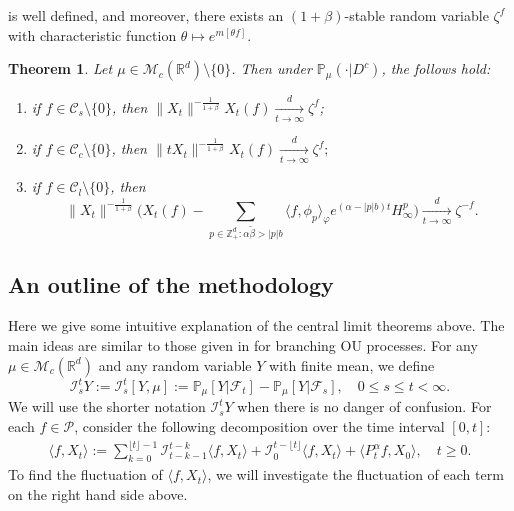 \documentclass[12pt,a4paper]{amsart}
\theoremstyle{plain}
\newtheorem{thm}{Theorem}[section]
\theoremstyle{definition}
\numberwithin{equation}{section}
\begin{document}
    is well defined, and moreover, there exists an $(1+\beta)$-stable random variable $\zeta^f$ with characteristic function $\theta \mapsto e^{m[\theta f]}$.
    \begin{thm}
      \label{thm:M}
    Let $\mu\in \mathcal M_c(\mathbb R^d)\setminus \{0\}$.
    Then under $\mathbb{P}_{\mu}(\cdot|D^c)$, the follows hold:
\begin{enumerate}
\item
  \label{thm:M:1}
  if $f\in \mathcal C_s\setminus\{0\}$, then $\|X_t\|^{- \frac{1}{1+\beta}} X_t(f)  \xrightarrow[t\to \infty]{d} \zeta^f$;
\item
  \label{thm:M:2}
  if $f\in \mathcal C_c\setminus\{0\}$, then
  \(
    \|t X_t\|^{-\frac{1}{1+\beta}} X_t(f)
    \xrightarrow[t\to \infty]{d}
    \zeta^f;
    \)
  \item
    \label{thm:M:3}
    if $f\in \mathcal C_l\setminus\{0\}$, then
\[
  \|X_t\|^{-\frac{1}{1+\beta}} \Big( X_t(f) - \sum_{p\in \mathbb Z^d_+:\alpha \tilde \beta>|p|b}\langle f,\phi_p\rangle_\varphi e^{(\alpha-|p|b)t}H^p_{\infty}\Big)
    \xrightarrow[t\to \infty]{d}
    \zeta^{-f}.
\]
\end{enumerate}
\end{thm}


\subsection{An outline of the methodology}
Here we give some intuitive explanation of the central limit theorems above.
The main ideas are similar to those given in \cite{MarksMilos2018CLT} for branching OU processes.
For any $\mu\in \mathcal M_c(\mathbb R^d)$ and any random variable $Y$ with finite mean, we define
\begin{equation}
  \label{Ist}
  \mathcal I_s^t Y
  := \mathcal I_s^t [Y, \mu]
  := \mathbb P_\mu[Y|\mathscr F_t] - \mathbb P_\mu[Y|\mathscr F_s],
  \quad 0 \leq s \leq t <\infty.
\end{equation}
We will use the shorter notation $\mathcal I_s^t Y$ when there is no danger of confusion.
For each $f\in \mathcal{P}$, consider the following decomposition over the time interval $[0,t]$:
\begin{align}
  \langle f,X_t\rangle
  := \sum_{k=0}^{\lfloor t \rfloor-1} \mathcal I_{t-k-1}^{t-k}\langle f ,X_t\rangle+\mathcal I_0^{t-\lfloor t \rfloor}\langle f ,X_t\rangle + \langle P^\alpha_tf,X_0\rangle,
  \quad t\geq 0.
\end{align}
To find the fluctuation of $\langle f,X_t\rangle$, we will investigate the fluctuation of each term on the right hand side above.
\end{document}
